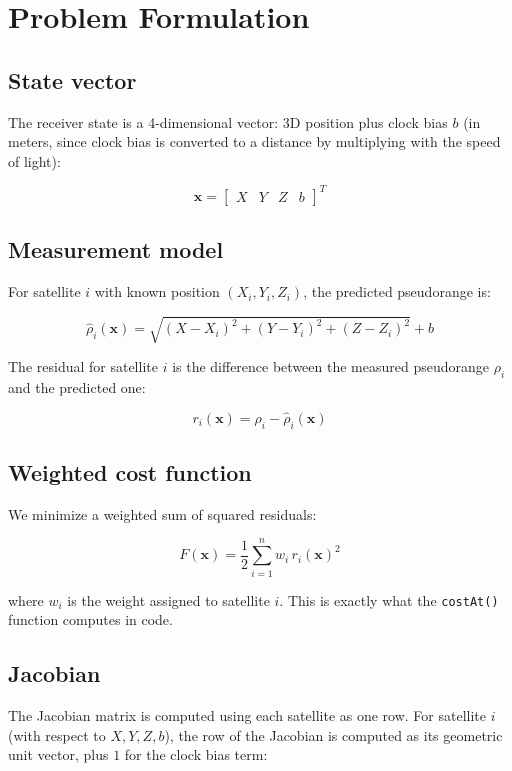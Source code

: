 \documentclass[11pt]{article}
\begin{document}
\section{Problem Formulation}

\subsection{State vector}

The receiver state is a 4-dimensional vector: 3D position plus clock bias $b$ (in meters, since clock bias is converted to a distance by multiplying with the speed of light):

\[
\mathbf{x} = \begin{bmatrix} X & Y & Z & b \end{bmatrix}^T
\]

\subsection{Measurement model}

For satellite $i$ with known position $(X_i, Y_i, Z_i)$, the predicted pseudorange is:

\[
\hat{\rho}_i(\mathbf{x}) = \sqrt{(X - X_i)^2 + (Y - Y_i)^2 + (Z - Z_i)^2} + b
\]

The residual for satellite $i$ is the difference between the measured pseudorange $\rho_i$ and the predicted one:

\[
r_i(\mathbf{x}) = \rho_i - \hat{\rho}_i(\mathbf{x})
\]

\subsection{Weighted cost function}

We minimize a weighted sum of squared residuals:

\[
F(\mathbf{x}) = \frac{1}{2}\sum_{i=1}^{n} w_i \, r_i(\mathbf{x})^2
\]

where $w_i$ is the weight assigned to satellite $i$. This is exactly what the \texttt{costAt()} function computes in code.

\subsection{Jacobian}

The Jacobian matrix is computed using each satellite as one row. For satellite $i$ (with respect to $X, Y, Z, b$), the row of the Jacobian is computed as its geometric unit vector, plus $1$ for the clock bias term:
\end{document}
